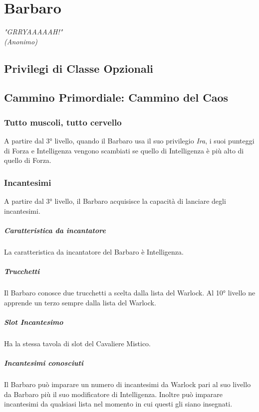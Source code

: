 \chapter{Barbaro}

\begin{DndReadAloud}
    \it
    "GRRYAAAAAH!" \\ (Anonimo)
  \end{DndReadAloud}

\section{Privilegi di Classe Opzionali}

\section{Cammino Primordiale: Cammino del Caos}

\subsection{Tutto muscoli, tutto cervello}
A partire dal 3° livello, quando il Barbaro usa il suo privilegio \textit{Ira}, i suoi punteggi di Forza e Intelligenza vengono scambiati se quello di Intelligenza è più alto di quello di Forza.

\subsection{Incantesimi}
A partire dal 3° livello, il Barbaro acquisisce la capacità di lanciare degli incantesimi.
\paragraph{Caratteristica da incantatore} La caratteristica da incantatore del Barbaro è Intelligenza.
\paragraph{Trucchetti} Il Barbaro conosce due trucchetti a scelta dalla lista del Warlock. Al 10° livello ne apprende un terzo sempre dalla lista del Warlock.
\paragraph{Slot Incantesimo} Ha la stessa tavola di slot del Cavaliere Mistico.
\paragraph{Incantesimi conosciuti} Il Barbaro può imparare un numero di incantesimi da Warlock pari al suo livello da Barbaro più il suo modificatore di Intelligenza. Inoltre può imparare incantesimi da qualsiasi lista nel momento in cui questi gli siano insegnati.

